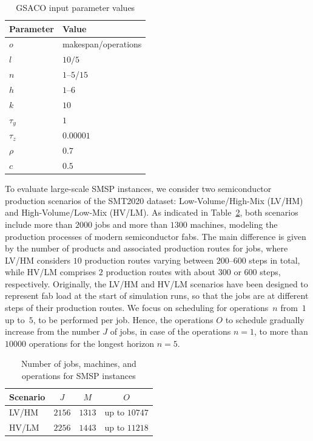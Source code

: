 \begin{table}[t]
	\caption{GSACO input parameter values}\label{tab:p_value} \centering
	\begin{tabular}{|l|l|}
		\hline
		Parameter & Value \\ \hline
		$o$ & makespan/operations        \\
		$l$ & $10/5$        \\
		$n$ & $1$--$5$/$15$ \\
		$h$ & $1$--$6$ \\
		$k$ & $10$ \\
		$\tau_{y}$ & $1$ \\
		$\tau_{z}$ & $0.00001$ \\
		$\rho$ & $0.7$ \\
		$c$ & $0.5$ \\
		\hline
	\end{tabular}
\end{table}

To evaluate large-scale SMSP instances,
we consider two semiconductor production scenarios of the SMT2020 dataset:
Low-Volume/High-Mix (LV/HM) and High-Volume/Low-Mix (HV/LM).
As indicated in Table~\ref{tab:Dataset},
both scenarios include more than $2000$ jobs and more than $1300$ machines,
modeling the production processes of modern semiconductor fabs.
The main difference is given by the number of products and associated production routes for jobs, where LV/HM considers $10$ production routes varying between
$200$--$600$ steps in total, while HV/LM comprises $2$ production routes with about
$300$ or $600$ steps, respectively.
Originally, the LV/HM and HV/LM scenarios have been designed to represent fab load at the
start of simulation runs, so that the jobs are at different steps of their
production routes.
We focus on scheduling for operations~$n$ from~$1$ up to~$5$,
to be performed per job.
Hence, the operations $O$ to schedule gradually increase from the
number $J$ of jobs, in case of the operations $n=1$,
to more than $10000$ operations %
for the longest %
horizon $n=5$.

\begin{table}[t]
	\caption{Number of jobs, machines, and operations for SMSP instances}\label{tab:Dataset} \centering
	\begin{tabular}{|l|c|c|c|}
		\hline
		Scenario & $J$    & $M$    & $O$              \\ \hline
		LV/HM    & $2156$ & $1313$ & up to $10747$    \\ 
		HV/LM    & $2256$ & $1443$ & up to $11218$    \\
		\hline
	\end{tabular}
\end{table}
%

